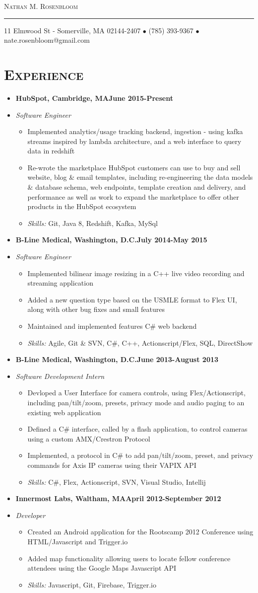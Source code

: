 \documentclass[10pt, oneside]{article}
\makeatletter
\newcommand{\lr}[2]{#1\hfill#2}
\newcommand{\name}{Nathan M. Rosenbloom}
\newcommand{\addr}{11 Elmwood St - Somerville, MA 02144-2407}
\newcommand{\phone}{(785) 393-9367}
\newcommand{\email}{nate.rosenbloom@gmail.com}
\newcommand{\resname}[4]{
  \begin{center}
    \selectfont\LARGE\scshape #1
    \normalfont
    \footnotesize
    \itshape
    \rule{\textwidth}{1pt}
    #2 $\bullet$ #3 $\bullet$ #4
    \normalfont
  \end{center}
}
\newcommand{\skills}[1]{
\item[] \textsl{Skills:} #1
}
\newenvironment{ressection}[1]{
  \section{\normalsize \scshape \selectfont #1 \normalfont}
  \vspace{-4pt}
  \begin{itemize} \itemsep-2pt
  }{
  \end{itemize}
  \vspace{-20pt}
}
\newenvironment{resitem}[4]{
\item[] \lr{\bfseries \selectfont #1\normalfont, #2} {#3}
\item[] \textsl{#4}
  \vspace{-4pt}
  \begin{itemize} \itemsep-2pt
  }{
  \end{itemize}
}
\makeatother
\begin{document}
\resname{\name}{\addr}{\phone}{\email}
\setcounter{secnumdepth}{-1} %

\begin{ressection}{Experience}
  \begin{resitem}{HubSpot}{Cambridge, MA}{June 2015-Present}{Software Engineer}
  \item Implemented analytics/usage tracking backend, ingestion - using kafka streams inspired by lambda architecture, and a web interface to query data in redshift
  \item Re-wrote the marketplace HubSpot customers can use to buy and sell website, blog \& email templates, including re-engineering the data models \& database schema, web endpoints, template creation and delivery, and performance as well as work to expand the marketplace to offer other products in the HubSpot ecosystem
    \skills{Git, Java 8, Redshift, Kafka, MySql}
  \end{resitem}
  \begin {resitem}{B-Line Medical}{Washington, D.C.}{July 2014-May 2015}{Software Engineer} 
  \item Implemented bilinear image resizing in a C++ live video recording and streaming application
  \item Added a new question type based on the USMLE format to Flex UI, along with other bug fixes and small features
  \item Maintained and implemented features  C\# web backend
    \skills{Agile, Git \& SVN, C\#, C++, Actionscript/Flex, SQL, DirectShow}
  \end{resitem}
  \begin{resitem}{B-Line Medical}{Washington, D.C.}{June 2013-August 2013}{Software Development Intern}
  \item Devloped a User Interface for camera controls, using Flex/Actionscript, including pan/tilt/zoom, presets, privacy mode and audio paging to an existing web application
  \item Defined a C\# interface, called by a flash application, to control cameras using a custom AMX/Crestron Protocol
  \item Implemented, a protocol in C\# to add pan/tilt/zoom, preset, and privacy commands for Axis IP cameras using their VAPIX API
    \skills{C\#, Flex, Actionscript, SVN, Visual Studio, Intellij}
  \end{resitem}
  \begin{resitem}{Innermost Labs}{Waltham, MA}{April 2012-September 2012}{Developer}
  \item Created an Android application for the Rootscamp 2012 Conference using HTML/Javascript and Trigger.io
  \item Added map functionality allowing users to locate fellow conference attendees  using the Google Maps Javascript API
    \skills{Javascript, Git, Firebase, Trigger.io}
  \end{resitem}
\end{ressection}
\end{document}
